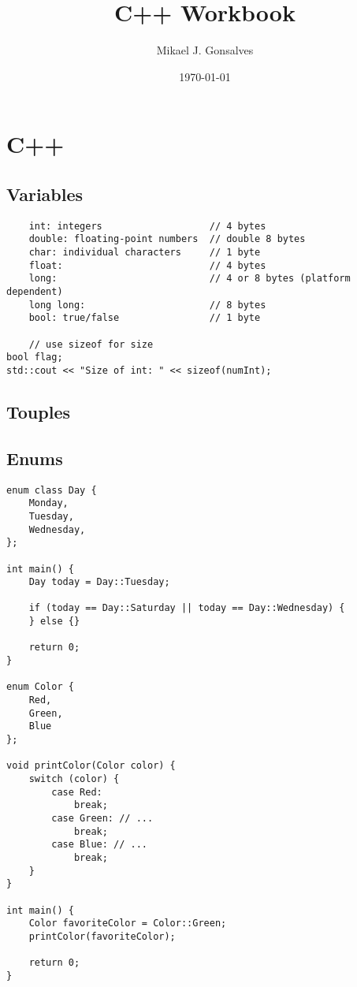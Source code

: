 \documentclass[openany]{report}
\title{C++ Workbook}
\author{Mikael J. Gonsalves}
\date{\today}
\begin{document}
\maketitle
\tableofcontents



\chapter{C++}

\section{Variables}

\begin{verbatim}
    int: integers                   // 4 bytes
    double: floating-point numbers  // double 8 bytes
    char: individual characters     // 1 byte
    float:                          // 4 bytes
    long:                           // 4 or 8 bytes (platform dependent)
    long long:                      // 8 bytes
    bool: true/false                // 1 byte

    // use sizeof for size
bool flag;
std::cout << "Size of int: " << sizeof(numInt); 

\end{verbatim}


\section{Touples}


\section{Enums}

\begin{verbatim}
enum class Day {
    Monday,
    Tuesday,
    Wednesday,
};

int main() {
    Day today = Day::Tuesday;

    if (today == Day::Saturday || today == Day::Wednesday) {
    } else {}

    return 0;
}

enum Color {
    Red,
    Green,
    Blue
};

void printColor(Color color) {
    switch (color) {
        case Red:
            break;
        case Green: // ...
            break;
        case Blue: // ...
            break;
    }
}

int main() {
    Color favoriteColor = Color::Green;
    printColor(favoriteColor);

    return 0;
}
\end{verbatim}
\end{document}
